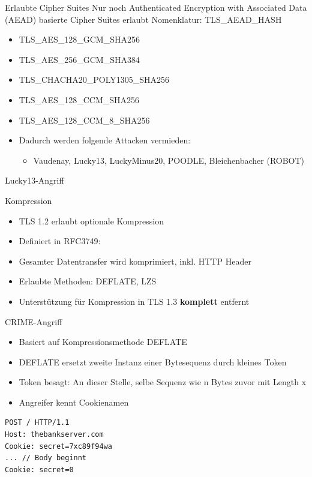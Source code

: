 \documentclass{f4_beamer_metropolis}
\begin{document}
\begin{frame}{Erlaubte Cipher Suites}
Nur noch Authenticated Encryption with Associated Data (AEAD) basierte Cipher Suites erlaubt
Nomenklatur: TLS\_AEAD\_HASH
  \begin{itemize}
    \item TLS\_AES\_128\_GCM\_SHA256
    \item TLS\_AES\_256\_GCM\_SHA384
    \item TLS\_CHACHA20\_POLY1305\_SHA256
    \item TLS\_AES\_128\_CCM\_SHA256
    \item TLS\_AES\_128\_CCM\_8\_SHA256
  \end{itemize}

\begin{itemize}
  \item Dadurch werden folgende Attacken vermieden:
  \begin{itemize}
    \item Vaudenay, Lucky13, LuckyMinus20, POODLE, Bleichenbacher (ROBOT)
  \end{itemize}
\end{itemize}
\end{frame}

\begin{frame}{Lucky13-Angriff}
\end{frame}

\begin{frame}{Kompression}
\begin{itemize}
  \item TLS 1.2 erlaubt optionale Kompression
  \item Definiert in RFC3749: 
  \item Gesamter Datentransfer wird komprimiert, inkl. HTTP Header
  \item Erlaubte Methoden: DEFLATE, LZS
  \item Unterstützung für Kompression in TLS 1.3 \textbf{komplett} entfernt
\end{itemize}
\end{frame}

\begin{frame}[fragile]{CRIME-Angriff}
\begin{itemize}
  \item Basiert auf Kompressionsmethode DEFLATE
  \item DEFLATE ersetzt zweite Instanz einer Bytesequenz durch kleines Token
  \item Token besagt: An dieser Stelle, selbe Sequenz wie n Bytes zuvor mit Length x
  \item Angreifer kennt Cookienamen
\end{itemize}
\begin{lstlisting}[frame=single]
POST / HTTP/1.1
Host: thebankserver.com
Cookie: secret=7xc89f94wa
... // Body beginnt
Cookie: secret=0
\end{lstlisting}
\end{frame}
\end{document}
